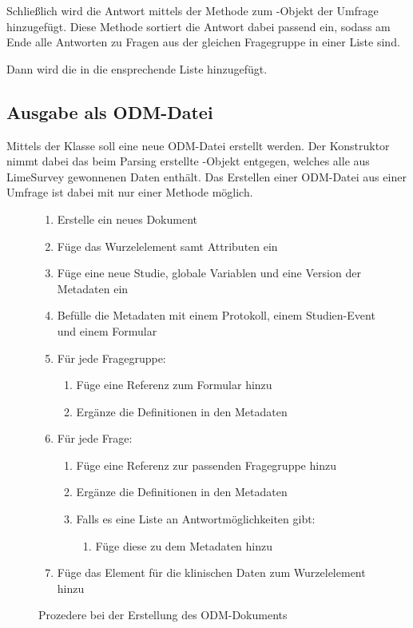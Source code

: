 Schließlich wird die Antwort mittels der Methode  zum -Objekt der Umfrage hinzugefügt.
Diese Methode sortiert die Antwort dabei passend ein, sodass am Ende alle Antworten zu Fragen aus der gleichen Fragegruppe in einer Liste sind.

Dann wird die  in die ensprechende Liste hinzugefügt.

\subsection{Ausgabe als ODM-Datei}

Mittels der Klasse  soll eine neue ODM-Datei erstellt werden. Der Konstruktor nimmt dabei das beim Parsing erstellte -Objekt entgegen, welches alle aus LimeSurvey gewonnenen Daten enthält. %
Das Erstellen einer ODM-Datei aus einer Umfrage ist dabei mit nur einer Methode möglich.

\begin{figure}[t]
	\begin{enumerate}
		\item Erstelle ein neues Dokument
		\item Füge das Wurzelelement samt Attributen ein
		\item Füge eine neue Studie, globale Variablen und eine Version der Metadaten ein
		\item Befülle die Metadaten mit einem Protokoll, einem Studien-Event und einem Formular
		\item Für jede Fragegruppe:
			\begin{enumerate}
				\item Füge eine Referenz zum Formular hinzu
				\item Ergänze die Definitionen in den Metadaten
			\end{enumerate}
		\item Für jede Frage:
			\begin{enumerate}
				\item Füge eine Referenz zur passenden Fragegruppe hinzu
				\item Ergänze die Definitionen in den Metadaten
				\item Falls es eine Liste an Antwortmöglichkeiten gibt:
					\begin{enumerate}
						\item Füge diese zu dem Metadaten hinzu
					\end{enumerate}
			\end{enumerate}
		\item Füge das Element für die klinischen Daten zum Wurzelelement hinzu
	\end{enumerate}
	\caption{Prozedere bei der Erstellung des ODM-Dokuments}
	\label{alg:odm}
\end{figure}

